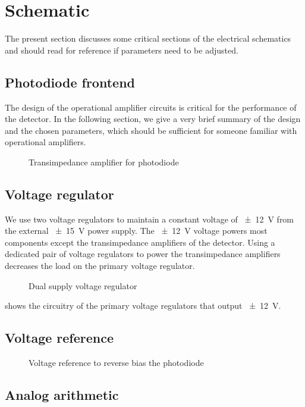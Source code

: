 \section{Schematic}

The present section discusses some critical sections of the electrical schematics and should read for reference if parameters need to be adjusted.

\subsection{Photodiode frontend}

The design of the operational amplifier circuits is critical for the performance of the detector.
In the following section, we give a very brief summary of the design and the chosen parameters, which should be sufficient for someone familiar with operational amplifiers.

\begin{figure}[H]
	\centering
	
 	\caption{Transimpedance amplifier for photodiode}\label{fig:transimpedance_amplifier}
\end{figure}

\subsection{Voltage regulator}

We use two voltage regulators to maintain a constant voltage of \SI{\pm12}{\volt} from the external \SI{\pm15}{\volt} power supply. The \SI{\pm12}{\volt} voltage powers most components except the transimpedance amplifiers of the detector.
Using a dedicated pair of voltage regulators to power the transimpedance amplifiers decreases the load on the primary voltage regulator.

\begin{figure}[H]
	\centering
	
	\caption{Dual supply voltage regulator}\label{fig:voltage_regulator_dual}
\end{figure}
 shows the circuitry of the primary voltage regulators that output \SI{\pm12}{\volt}.

\subsection{Voltage reference}

\begin{figure}[H]
	\centering
	
	\caption{Voltage reference to reverse bias the photodiode}\label{fig:voltage_regulator_dual}
\end{figure}

\subsection{Analog arithmetic}
